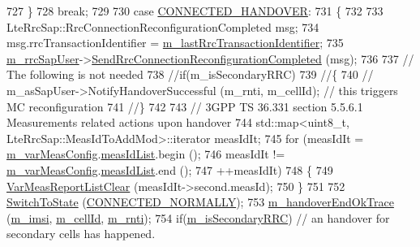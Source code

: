 \begin{DoxyCode}
727       \}
728       \textcolor{keywordflow}{break};
729 
730     \textcolor{keywordflow}{case} \hyperlink{classns3_1_1LteUeRrc_a241012c291e75681150c9214e11f6145a619fb36d614e3e051f981aa3d43a633c}{CONNECTED\_HANDOVER}:
731       \{
732 
733           LteRrcSap::RrcConnectionReconfigurationCompleted msg;
734         msg.rrcTransactionIdentifier = \hyperlink{classns3_1_1LteUeRrc_a01851d519c1a0355b2f0b76ffb540321}{m\_lastRrcTransactionIdentifier};
735         \hyperlink{classns3_1_1LteUeRrc_a9636e38d20aa1d75c9423d43648f2a1a}{m\_rrcSapUser}->\hyperlink{classns3_1_1LteUeRrcSapUser_a3efef9068dfacdd9ac38f7b254b195b2}{SendRrcConnectionReconfigurationCompleted}
       (msg);
736 
737         \textcolor{comment}{// The following is not needed}
738         \textcolor{comment}{//if(m\_isSecondaryRRC)}
739         \textcolor{comment}{//\{}
740         \textcolor{comment}{//  m\_asSapUser->NotifyHandoverSuccessful (m\_rnti, m\_cellId); // this triggers MC reconfiguration  
             }
741         \textcolor{comment}{//\}}
742 
743         \textcolor{comment}{// 3GPP TS 36.331 section 5.5.6.1 Measurements related actions upon handover}
744         std::map<uint8\_t, LteRrcSap::MeasIdToAddMod>::iterator measIdIt;
745         \textcolor{keywordflow}{for} (measIdIt = \hyperlink{classns3_1_1LteUeRrc_a27a7773eedfdab964d2514d9eeb1c562}{m\_varMeasConfig}.\hyperlink{structns3_1_1LteUeRrc_1_1VarMeasConfig_aa7ad91f943892cec48ffa9a5ae872e8c}{measIdList}.begin ();
746              measIdIt != \hyperlink{classns3_1_1LteUeRrc_a27a7773eedfdab964d2514d9eeb1c562}{m\_varMeasConfig}.\hyperlink{structns3_1_1LteUeRrc_1_1VarMeasConfig_aa7ad91f943892cec48ffa9a5ae872e8c}{measIdList}.end ();
747              ++measIdIt)
748           \{
749             \hyperlink{classns3_1_1LteUeRrc_aa1a5d20a96dec717502ccf0030921f53}{VarMeasReportListClear} (measIdIt->second.measId);
750           \}
751 
752         \hyperlink{classns3_1_1LteUeRrc_a15f1bea4c3c8d3f9949b234c0cfa12e6}{SwitchToState} (\hyperlink{classns3_1_1LteUeRrc_a241012c291e75681150c9214e11f6145a29dc4c52bd374f1b78508fb725de9999}{CONNECTED\_NORMALLY});
753         \hyperlink{classns3_1_1LteUeRrc_a72e8b2d3a4b7a8b0dcb3c66d91ec0f79}{m\_handoverEndOkTrace} (\hyperlink{classns3_1_1LteUeRrc_a1d825677309d17bdf729920f7dafd011}{m\_imsi}, \hyperlink{classns3_1_1LteUeRrc_aa9d3317734eea9158371d9fccf3a0c48}{m\_cellId}, 
      \hyperlink{classns3_1_1LteUeRrc_a8e078d8ef0ad23e670fe2ef08caab84f}{m\_rnti});
754         \textcolor{keywordflow}{if}(\hyperlink{classns3_1_1LteUeRrc_a00a3ffa4dd31c1ab66921a9a019f5586}{m\_isSecondaryRRC}) \textcolor{comment}{// an handover for secondary cells has happened. }

\end{DoxyCode}
